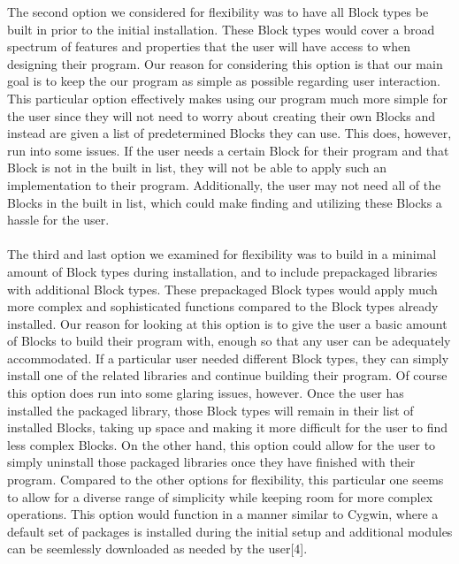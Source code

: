 \documentclass[journal,10pt,onecolumn,compsoc]{IEEEtran} \usepackage[margin=1.0in]{geometry} \usepackage{pdfpages} \usepackage{graphicx}
\begin{document}
\indent The second option we considered for flexibility was to have all Block types be built in prior to the initial installation. These Block types would cover a broad spectrum of features and properties that the user will have access to when designing their program. Our reason for considering this option is that our main goal is to keep the our program as simple as possible regarding user interaction. This particular option effectively makes using our program much more simple for the user since they will not need to worry about creating their own Blocks and instead are given a list of predetermined Blocks they can use. This does, however, run into some issues. If the user needs a certain Block for their program and that Block is not in the built in list, they will not be able to apply such an implementation to their program. Additionally, the user may not need all of the Blocks in the built in list, which could make finding and utilizing these Blocks a hassle for the user.
\\
\\
\indent The third and last option we examined for flexibility was to build in a minimal amount of Block types during installation, and to include prepackaged libraries with additional Block types. These prepackaged Block types would apply much more complex and sophisticated functions compared to the Block types already installed. Our reason for looking at this option is to give the user a basic amount of Blocks to build their program with, enough so that any user can be adequately accommodated. If a particular user needed different Block types, they can simply install one of the related libraries and continue building their program. Of course this option does run into some glaring issues, however. Once the user has installed the packaged library, those Block types will remain in their list of installed Blocks, taking up space and making it more difficult for the user to find less complex Blocks. On the other hand, this option could allow for the user to simply uninstall those packaged libraries once they have finished with their program. Compared to the other options for flexibility, this particular one seems to allow for a diverse range of simplicity while keeping room for more complex operations. This option would function in a manner similar to Cygwin, where a default set of packages is installed during the initial setup and additional modules can be seemlessly downloaded as needed by the user[4].
\\
\newpage
\end{document}
